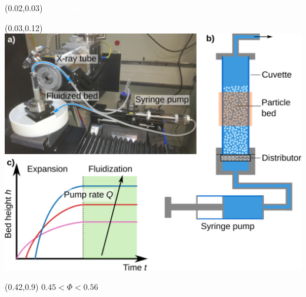 \begin{frame}[noframenumbering]

\begin{textblock}{0.6}(0.02,0.03)
	\textcolor{white}{
		\Large Experiments: A liquid fluidized bed}
\end{textblock}

\begin{textblock}{0.6}(0.03,0.12)
		\includegraphics[width=\textwidth]{Sources/X-DFA/experiment-fluidized_bed_1.pdf}
\end{textblock}

\begin{textblock}{0.6}(0.42,0.9)
	$0.45 < \Phi < 0.56$
\end{textblock}



\end{frame}
